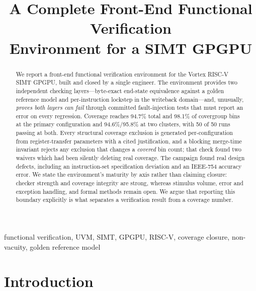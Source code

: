 \documentclass[conference]{IEEEtran}
\begin{document}
\title{A Complete Front-End Functional Verification\\
Environment for a SIMT GPGPU}

\author{
}

\maketitle

\begin{abstract}
We report a front-end functional verification environment for the Vortex
RISC-V SIMT GPGPU, built and closed by a single engineer. The environment
provides two independent checking layers---byte-exact end-state
equivalence against a golden reference model and per-instruction lockstep
in the writeback domain---and, unusually, \emph{proves both layers can
fail} through committed fault-injection tests that must report an error on
every regression. Coverage reaches 94.7\% total and 98.1\% of covergroup
bins at the primary configuration and 94.6\%/95.8\% at two clusters, with
50 of 50 runs passing at both. Every structural coverage exclusion is
generated per-configuration from register-transfer parameters with a cited
justification, and a blocking merge-time invariant rejects any exclusion
that changes a \emph{covered} bin count; that check found two waivers
which had been silently deleting real coverage. The campaign found real
design defects, including an instruction-set specification deviation and
an IEEE-754 accuracy error. We state the environment's maturity by axis
rather than claiming closure: checker strength and coverage integrity are
strong, whereas stimulus volume, error and exception handling, and formal
methods remain open. We argue that reporting this boundary explicitly is
what separates a verification result from a coverage number.
\end{abstract}

\begin{IEEEkeywords}
functional verification, UVM, SIMT, GPGPU, RISC-V, coverage closure,
non-vacuity, golden reference model
\end{IEEEkeywords}

\section{Introduction}
\end{document}
